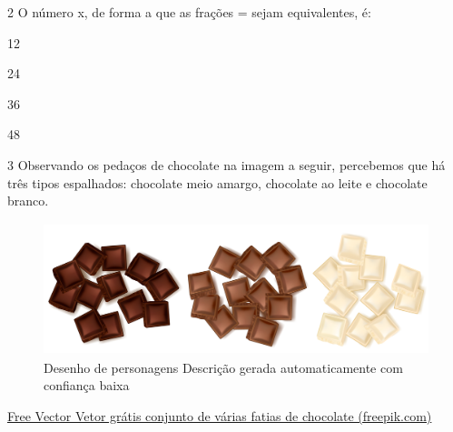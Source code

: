\begin{escolha}
\begin{boxmedio}
\begin{boxmedio}
{\begin{boxpeq}
\begin{boxpeq}
{\begin{escolha}
\end{escolha}


\num{2} O número x, de forma a que as frações
 =  sejam equivalentes, é:

\begin{escolha}

\item 12
\item 24
\item 36
\item 48

\end{escolha}


\num{3} Observando os pedaços de chocolate na imagem a seguir, percebemos 
que há três tipos espalhados: chocolate meio amargo, chocolate ao leite e
chocolate branco. 

\begin{figure}
\centering
\includegraphics[width=4.54097in,height=1.51544in]{./_SAEB_9_MAT/media/image53.png}
\caption{Desenho de personagens Descrição gerada automaticamente com
confiança baixa}
\end{figure}

\href{https://br.freepik.com/vetores-gratis/conjunto-de-varias-fatias-de-chocolate_10155086.htm\#page=2\&query=chocolate\&position=49\&from_view=search\&track=sph}{Free
Vector \textbar{} Vetor grátis conjunto de várias fatias de chocolate
(freepik.com)}

}
\end{boxpeq}
\end{boxpeq}}
\end{boxmedio}
\end{boxmedio}
\end{escolha}
